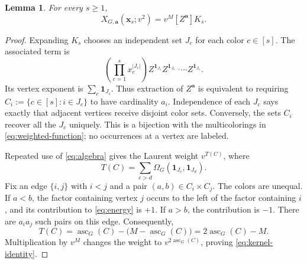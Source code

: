 \documentclass[11pt]{article}
\newtheorem{lemma}[theorem]{Lemma}
\theoremstyle{remark}
\newcommand{\xx}{\mathbf x}
\newcommand{\avec}{\mathbf a}
\newcommand{\one}{\mathbf 1}
\DeclareMathOperator{\asc}{asc}
\numberwithin{equation}{section}
\begin{document}
\begin{lemma}\label{lem:kernel}
For every $s\geq1$,
\begin{equation}\label{eq:kernel-identity}
 X_{G,\avec}(\xx_s;v^2)=v^M[Z^{\avec}]K_s.
\end{equation}
\end{lemma}
\begin{proof}
Expanding $K_s$ chooses an independent set $J_c$ for each color
$c\in[s]$. The associated term is
\[
 \left(\prod_{c=1}^s x_c^{|J_c|}\right)
 Z^{\one_{J_s}}Z^{\one_{J_{s-1}}}\cdots Z^{\one_{J_1}}.
\]
Its vertex exponent is $\sum_c\one_{J_c}$. Thus extraction of
$Z^{\avec}$ is equivalent to requiring
$C_i:=\{c\in[s]:i\in J_c\}$ to have cardinality $a_i$.
Independence of each $J_c$ says exactly that adjacent vertices receive
disjoint color sets. Conversely, the sets $C_i$ recover all the $J_c$
uniquely. This is a bijection with the multicolorings in
\eqref{eq:weighted-function}; no occurrences at a vertex are labeled.

Repeated use of \eqref{eq:algebra} gives the Laurent weight
$v^{T(C)}$, where
\begin{equation}\label{eq:energy}
 T(C)=\sum_{c>d}\Omega_G(\one_{J_c},\one_{J_d}).
\end{equation}
Fix an edge $\{i,j\}$ with $i<j$ and a pair
$(a,b)\in C_i\times C_j$. The colors are unequal. If $a<b$, the
factor containing vertex $j$ occurs to the left of the factor
containing $i$, and its contribution to \eqref{eq:energy} is $+1$.
If $a>b$, the contribution is $-1$. There are $a_i a_j$ such pairs
on this edge. Consequently,
\begin{equation}\label{eq:normalization}
 T(C)=\asc_G(C)-\bigl(M-\asc_G(C)\bigr)
     =2\asc_G(C)-M.
\end{equation}
Multiplication by $v^M$ changes the weight to
$v^{2\asc_G(C)}$, proving \eqref{eq:kernel-identity}.
\end{proof}
\end{document}
